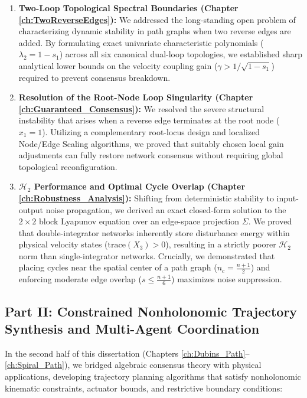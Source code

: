 \begin{enumerate}
    \item \textbf{Two-Loop Topological Spectral Boundaries (Chapter \ref{ch:TwoReverseEdges}):} We addressed the long-standing open problem of characterizing dynamic stability in path graphs when two reverse edges are added. By formulating exact univariate characteristic polynomials ($\lambda_2 = 1 - s_1$) across all six canonical dual-loop topologies, we established sharp analytical lower bounds on the velocity coupling gain ($\gamma > 1/\sqrt{1 - s_1}$) required to prevent consensus breakdown.
    
    \item \textbf{Resolution of the Root-Node Loop Singularity (Chapter \ref{ch:Guaranteed_Consensus}):} We resolved the severe structural instability that arises when a reverse edge terminates at the root node ($x_1 = 1$). Utilizing a complementary root-locus design and localized Node/Edge Scaling algorithms, we proved that suitably chosen local gain adjustments can fully restore network consensus without requiring global topological reconfiguration.
    
    \item \textbf{$\mathcal{H}_2$ Performance and Optimal Cycle Overlap (Chapter \ref{ch:Robustness_Analysis}):} Shifting from deterministic stability to input-output noise propagation, we derived an exact closed-form solution to the $2 \times 2$ block Lyapunov equation over an edge-space projection $\Sigma$. We proved that double-integrator networks inherently store disturbance energy within physical velocity states ($\text{trace}(X_3) > 0$), resulting in a strictly poorer $\mathcal{H}_2$ norm than single-integrator networks. Crucially, we demonstrated that placing cycles near the spatial center of a path graph ($n_c = \frac{n+1}{2}$) and enforcing moderate edge overlap ($s \le \frac{n+1}{6}$) maximizes noise suppression.
\end{enumerate}

\subsection{Part II: Constrained Nonholonomic Trajectory Synthesis and Multi-Agent Coordination}

In the second half of this dissertation (Chapters \ref{ch:Dubins_Path}--\ref{ch:Spiral_Path}), we bridged algebraic consensus theory with physical applications, developing trajectory planning algorithms that satisfy nonholonomic kinematic constraints, actuator bounds, and restrictive boundary conditions:

